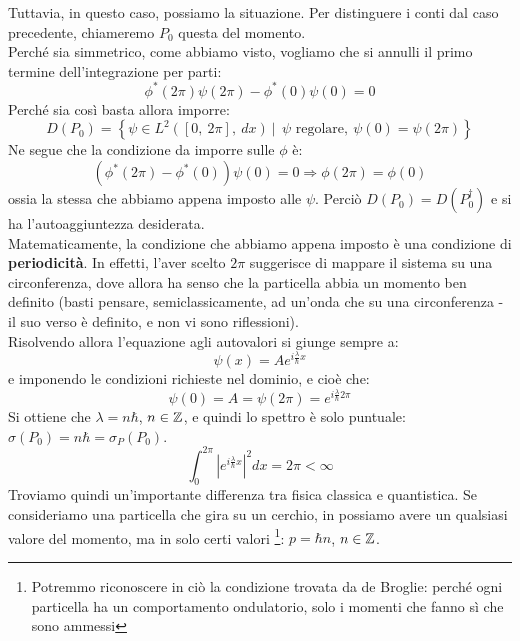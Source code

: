 \documentclass[../../FisicaTeorica.tex]{subfiles}
\begin{document}
Tuttavia, in questo caso, possiamo  la situazione. Per distinguere i conti dal caso precedente, chiameremo $P_0$ questa  del momento.\\
Perché sia simmetrico, come abbiamo visto, vogliamo che si annulli il primo termine dell'integrazione per parti:
\[
\phi^\ast\left(2\pi\right)\psi\left(2\pi\right)-\phi^\ast\left(0\right)\psi \left(0\right)=0
\]
Perché sia così basta allora imporre:
\[
D\left(P_0\right)=\left\{\psi\in L^2\left(\left[0,\ 2\pi\right],\ dx\right)\ |\ \ \psi\text{ regolare},\ \psi\left(0\right)=\psi(2\pi)\right\}
\]
Ne segue che la condizione da imporre sulle $\phi$ è:
\[
\left(\phi^\ast\left(2\pi\right)-\phi^\ast\left(0\right)\right)\psi \left(0\right)=0\Rightarrow \phi \left(2\pi\right)=\phi \left(0\right)
\]
ossia la stessa che abbiamo appena imposto alle $\psi$. Perciò $D\left(P_0\right)=D\left(P_0^\dag\right)$ e si ha l'autoaggiuntezza desiderata.\\
Matematicamente, la condizione che abbiamo appena imposto è una condizione di \textbf{periodicità}. In effetti, l'aver scelto $2\pi$  suggerisce di mappare il sistema su una circonferenza, dove allora ha senso che la particella abbia un momento ben definito (basti pensare, semiclassicamente, ad un'onda che  su una circonferenza - il suo verso è definito, e non vi sono riflessioni).\\
Risolvendo allora l'equazione agli autovalori si giunge sempre a:
\[
\psi\left(x\right)=A e^{i\frac{\lambda}{\hbar}x}
\]
e imponendo le condizioni richieste nel dominio, e cioè che:
\[
\psi\left(0\right)=A= \psi \left(2\pi\right)=e^{i\frac{\lambda}{\hbar}2\pi}
\]
Si ottiene che $\lambda = n\hbar$, $n\in \mathbb{Z}$, e quindi lo spettro è solo puntuale: $\sigma(P_0) = n\hbar = \sigma_P(P_0)$.
\[
\int_{0}^{2\pi}{\left|e^{i\frac{\lambda}{\hbar}x}\right|^2dx=2\pi<\infty}
\]
Troviamo quindi un'importante differenza tra fisica classica e quantistica. Se consideriamo una particella che gira su un cerchio, in \MC possiamo avere un qualsiasi valore del momento, ma in \MQ solo certi valori \footnote{Potremmo riconoscere in ciò la condizione trovata da de Broglie: perché ogni particella ha un comportamento ondulatorio, solo i momenti che fanno sì che  sono ammessi}: $p=\hbar n$, $n\in \mathbb{Z}$.\\
\end{document}
